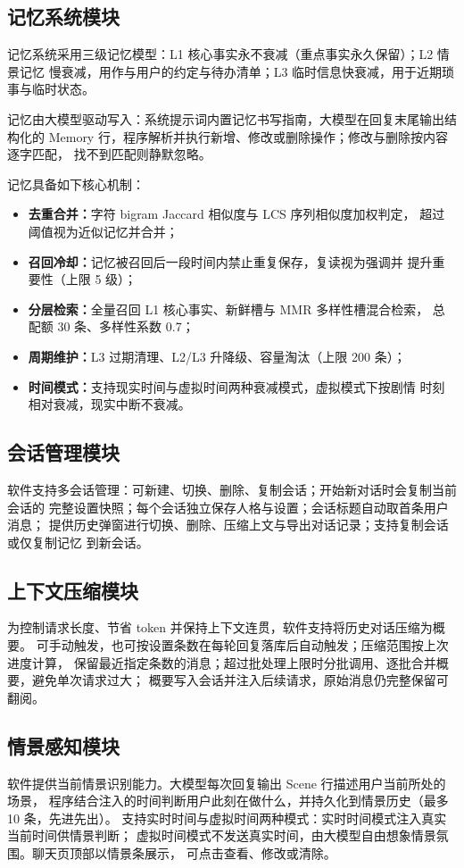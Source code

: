 \documentclass[zihao=5,a4paper]{ctexart}
\begin{document}
\subsection{记忆系统模块}
记忆系统采用三级记忆模型：L1 核心事实永不衰减（重点事实永久保留）；L2 情景记忆
慢衰减，用作与用户的约定与待办清单；L3 临时信息快衰减，用于近期琐事与临时状态。

记忆由大模型驱动写入：系统提示词内置记忆书写指南，大模型在回复末尾输出结构化的
Memory 行，程序解析并执行新增、修改或删除操作；修改与删除按内容逐字匹配，
找不到匹配则静默忽略。

记忆具备如下核心机制：
\begin{itemize}[itemsep=0pt,parsep=0pt]
  \item \textbf{去重合并：}字符 bigram Jaccard 相似度与 LCS 序列相似度加权判定，
        超过阈值视为近似记忆并合并；
  \item \textbf{召回冷却：}记忆被召回后一段时间内禁止重复保存，复读视为强调并
        提升重要性（上限 5 级）；
  \item \textbf{分层检索：}全量召回 L1 核心事实、新鲜槽与 MMR 多样性槽混合检索，
        总配额 30 条、多样性系数 0.7；
  \item \textbf{周期维护：}L3 过期清理、L2/L3 升降级、容量淘汰（上限 200 条）；
  \item \textbf{时间模式：}支持现实时间与虚拟时间两种衰减模式，虚拟模式下按剧情
        时刻相对衰减，现实中断不衰减。
\end{itemize}

\subsection{会话管理模块}
软件支持多会话管理：可新建、切换、删除、复制会话；开始新对话时会复制当前会话的
完整设置快照；每个会话独立保存人格与设置；会话标题自动取首条用户消息；
提供历史弹窗进行切换、删除、压缩上文与导出对话记录；支持复制会话或仅复制记忆
到新会话。

\subsection{上下文压缩模块}
为控制请求长度、节省 token 并保持上下文连贯，软件支持将历史对话压缩为概要。
可手动触发，也可按设置条数在每轮回复落库后自动触发；压缩范围按上次进度计算，
保留最近指定条数的消息；超过批处理上限时分批调用、逐批合并概要，避免单次请求过大；
概要写入会话并注入后续请求，原始消息仍完整保留可翻阅。

\subsection{情景感知模块}
软件提供当前情景识别能力。大模型每次回复输出 Scene 行描述用户当前所处的场景，
程序结合注入的时间判断用户此刻在做什么，并持久化到情景历史（最多 10 条，先进先出）。
支持实时时间与虚拟时间两种模式：实时时间模式注入真实当前时间供情景判断；
虚拟时间模式不发送真实时间，由大模型自由想象情景氛围。聊天页顶部以情景条展示，
可点击查看、修改或清除。
\end{document}
